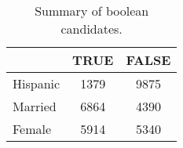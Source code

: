 \begin{table}[h!]
\centering
\begin{tabular}{|l|c|c|}
\hline
\rowcolor[HTML]{E7EAF6} 
\multicolumn{1}{|c|}{\textbf{Covariate}} & \multicolumn{1}{c|}{TRUE} & \multicolumn{1}{c|}{FALSE}\\ \hline
Hispanic & 1379 & 9875 \\ \hline
Married & 6864 & 4390 \\ \hline
Female & 5914 & 5340 \\ \hline
\end{tabular}
\caption{Summary of boolean candidates.}
\end{table}
